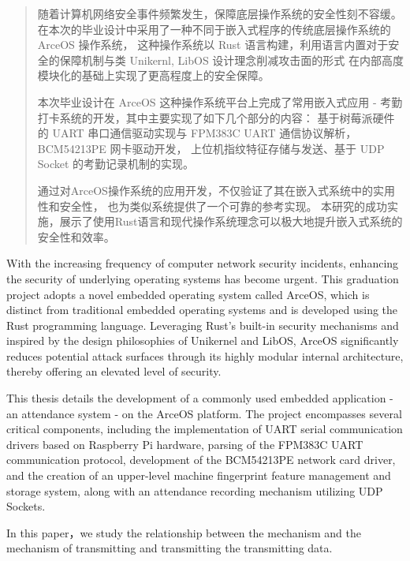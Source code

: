 \documentclass[UTF8,AutoFakeBold=1,AutoFakeSlant,zihao=-4]{scnuthesis}
\begin{document}
\coverpage

\newpage
\begin{abstract}
\fontsize{15}{20}\selectfont
随着计算机网络安全事件频繁发生，保障底层操作系统的安全性刻不容缓。
在本次的毕业设计中采用了一种不同于嵌入式程序的传统底层操作系统的 ArceOS 操作系统，
这种操作系统以 Rust 语言构建，利用语言内置对于安全的保障机制与类 Unikernl, LibOS 设计理念削减攻击面的形式
在内部高度模块化的基础上实现了更高程度上的安全保障。

本次毕业设计在 ArceOS 这种操作系统平台上完成了常用嵌入式应用 - 考勤打卡系统的开发，其中主要实现了如下几个部分的内容：
基于树莓派硬件的 UART 串口通信驱动实现与 FPM383C UART 通信协议解析，BCM54213PE 网卡驱动开发，
上位机指纹特征存储与发送、基于 UDP Socket 的考勤记录机制的实现。

通过对ArceOS操作系统的应用开发，不仅验证了其在嵌入式系统中的实用性和安全性，
也为类似系统提供了一个可靠的参考实现。
本研究的成功实施，展示了使用Rust语言和现代操作系统理念可以极大地提升嵌入式系统的安全性和效率。
\end{abstract}

\begin{abstractEN}
    With the increasing frequency of computer network security incidents, 
    enhancing the security of underlying operating systems has become urgent. 
    This graduation project adopts a novel embedded operating system called ArceOS, 
    which is distinct from traditional embedded operating systems 
    and is developed using the Rust programming language. 
    Leveraging Rust's built-in security mechanisms and 
    inspired by the design philosophies of Unikernel and LibOS, ArceOS significantly reduces potential 
    attack surfaces through its highly modular internal architecture, 
    thereby offering an elevated level of security.

    This thesis details the development of a commonly used embedded application - an attendance system - on the ArceOS platform. The project encompasses several critical components, including the implementation of UART serial communication drivers based on Raspberry Pi hardware, parsing of the FPM383C UART communication protocol, development of the BCM54213PE network card driver, and the creation of an upper-level machine fingerprint feature management and storage system, along with an attendance recording mechanism utilizing UDP Sockets.

    In this paper，we study the relationship between the mechanism and the mechanism of transmitting and transmitting the transmitting data.
\end{abstractEN}
\end{document}
